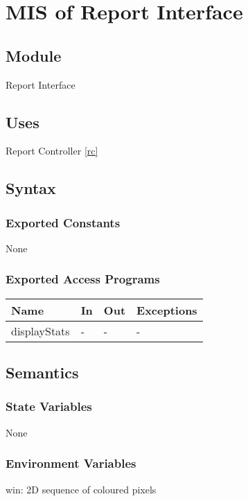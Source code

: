 \documentclass[12pt, titlepage]{article}
\begin{document}
\section{MIS of Report Interface} \label{ri}

\subsection{Module}

Report Interface

\subsection{Uses}

Report Controller \ref{rc}

\subsection{Syntax}

\subsubsection{Exported Constants}
None
\subsubsection{Exported Access Programs}

\begin{center}
\begin{tabular}{p{2cm} p{4cm} p{4cm} p{2cm}}
\hline
\textbf{Name} & \textbf{In} & \textbf{Out} & \textbf{Exceptions} \\
\hline
displayStats & - & - & - \\
\hline
\end{tabular}
\end{center}

\subsection{Semantics}

\subsubsection{State Variables}
None
\subsubsection{Environment Variables}
win: 2D sequence of coloured pixels
\end{document}
